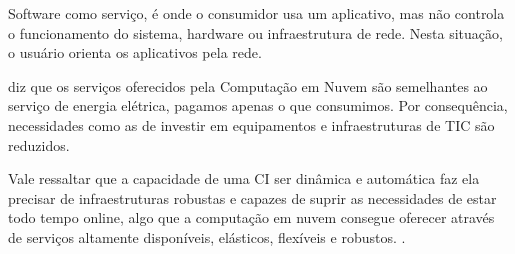 Software como serviço, é onde o consumidor usa um aplicativo, mas não controla o funcionamento do sistema, hardware ou infraestrutura de rede. Nesta situação, o usuário orienta os aplicativos pela rede. 

 diz que os serviços oferecidos pela Computação em Nuvem são semelhantes ao serviço de energia elétrica, pagamos apenas o que consumimos. Por consequência, necessidades como as de investir em equipamentos e infraestruturas de TIC são reduzidos.



Vale ressaltar que a capacidade de uma CI ser dinâmica e automática faz ela precisar de infraestruturas robustas e capazes de suprir as necessidades de estar todo tempo online, algo que a computação em nuvem consegue oferecer através de serviços altamente disponíveis, elásticos, flexíveis e robustos. \cite{kon-cloud}.

